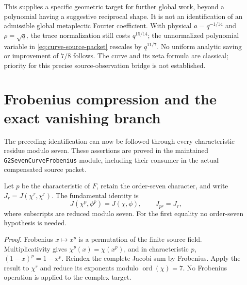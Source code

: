 \documentclass[11pt]{article}
\begin{document}
This supplies a specific geometric target for further global
work, beyond a polynomial having a suggestive reciprocal shape.
It is not an identification of an admissible global metaplectic
Fourier coefficient. With physical $a=q^{-1/14}$ and
$\rho=\sqrt q$, the trace normalization still costs $q^{15/14}$;
the unnormalized polynomial variable in
\eqref{eq:curve-source-packet} rescales by $q^{11/7}$.
No uniform analytic saving or improvement of $7/8$ follows.
The curve and its zeta formula are classical; priority for this
precise source-observation bridge is not established.

\section{Frobenius compression and the exact vanishing branch}
\label{sec:G2-seven-frobenius}

The preceding identification can now be followed through every
characteristic residue modulo seven. These assertions are proved in
the maintained \texttt{G2SevenCurveFrobenius} module, including their
consumer in the actual compensated source packet.

Let $p$ be the characteristic of $F$, retain the order-seven
character, and write $J_r=J(\chi^r,\chi^r)$. The fundamental identity
is
\[
 J(\chi^p,\phi^p)=J(\chi,\phi),\qquad J_{pr}=J_r,
 \tag{F.1}
\]
where subscripts are reduced modulo seven. For the first equality
no order-seven hypothesis is needed.

\emph{Proof.} Frobenius $x\mapsto x^p$ is a permutation of the
finite source field. Multiplicativity gives
$\chi^p(x)=\chi(x^p)$, and in characteristic $p$,
$(1-x)^p=1-x^p$. Reindex the complete Jacobi sum by Frobenius.
Apply the result to $\chi^r$ and reduce its exponents modulo
$\operatorname{ord}(\chi)=7$. No Frobenius operation is applied to
the complex target.
\end{document}
